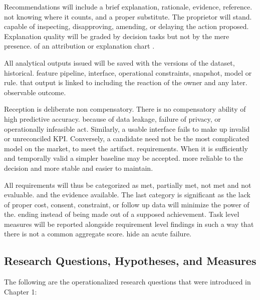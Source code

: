 \documentclass[a4paper,11pt,oneside]{book}
\theoremstyle{plain}
\theoremstyle{definition}
\theoremstyle{remark}
\begin{document}
\begin{description}[style=nextline,leftmargin=2em]
    \item[DR7: The power and knowledge of humans]
    Recommendations will include a brief explanation, rationale, evidence, reference. not knowing where it counts, and a proper substitute. The proprietor will stand. capable of inspecting, disapproving, amending, or delaying the action proposed. Explanation quality will be graded by decision tasks but not by the mere presence. of an attribution or explanation chart \cite{lundberg2017shap,miller2019explanation}.

    \item[DR8: responsibility and repeatability]
    All analytical outputs issued will be saved with the versions of the dataset, historical. feature pipeline, interface, operational constraints, snapshot, model or rule. that output is linked to including the reaction of the owner and any later. observable outcome.

\end{description}

Reception is deliberate non compensatory. There is no compensatory ability of high predictive accuracy. because of data leakage, failure of privacy, or operationally infeasible act. Similarly, a usable interface fails to make up invalid or unreconciled KPI. Conversely, a candidate need not be the most complicated model on the market, to meet the artifact. requirements. When it is sufficiently and temporally valid a simpler baseline may be accepted. more reliable to the decision and more stable and easier to maintain.

All requirements will thus be categorized as met, partially met, not met and not evaluable. and the evidence available. The last category is significant as the lack of proper cost, consent, constraint, or follow up data will minimize the power of the. ending instead of being made out of a supposed achievement. Task level measures will be reported alongside requirement level findings in such a way that there is not a common aggregate score. hide an acute failure.

\subsection{Research Questions, Hypotheses, and Measures}

The following are the operationalized research questions that were introduced in Chapter 1:
\end{document}
